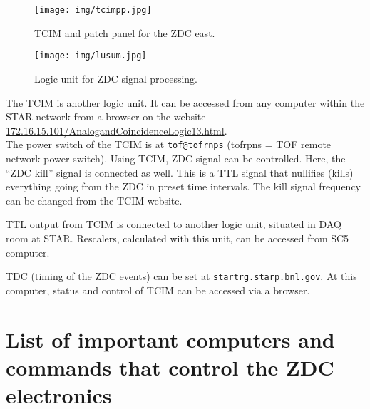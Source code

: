 \begin{figure}[htb]
\begin{center}
\texttt{[image: img/tcimpp.jpg]}
\end{center}
\caption{TCIM and patch panel for the ZDC east.}
\label{tcimpp}
\end{figure}


\begin{figure}[htb]
\begin{center}
\texttt{[image: img/lusum.jpg]}
\end{center}
\caption{Logic unit for ZDC signal processing.}
\label{lu_sum}
\end{figure}

The TCIM is another logic unit.  It can be accessed from any  computer within the STAR network
from a browser on the website\\ 
\url{172.16.15.101/AnalogandCoincidenceLogic13.html}.\\
The power switch of the TCIM is at \texttt{tof@tofrnps} (tofrpns = TOF remote network power switch).
Using TCIM, ZDC signal can be controlled. Here, the ``ZDC kill'' signal is connected as well. This is a TTL signal that nullifies (kills) everything going from the ZDC in preset time intervals. The
kill signal frequency can be changed from the TCIM website.

TTL output from TCIM is connected to another logic unit, situated in DAQ room at STAR. Rescalers, calculated with this unit, can be accessed from SC5 computer.

TDC (timing of the ZDC events) can be set at \texttt{startrg.starp.bnl.gov}. At this computer, status and control of TCIM can be accessed via a browser.

\section{\label{computers}List of important computers and commands that control the ZDC electronics}

